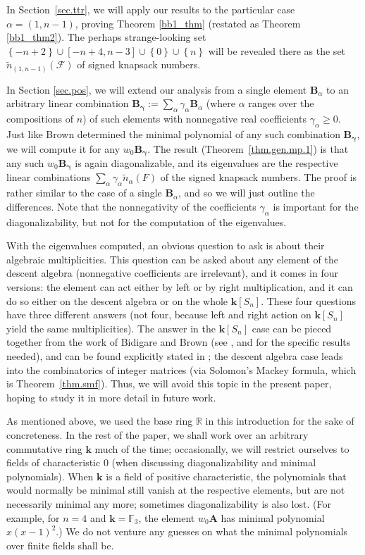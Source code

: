 \documentclass[12pt]{article}
\theoremstyle{definition}%
\theoremstyle{definition}%
\theoremstyle{remark}%
\newcommand{\tup}[1]{\left( #1 \right)}
\newcommand{\interval}[1]{\left[ #1 \right]} %
\newcommand{\set}[1]{\left\{ #1 \right\}}
\newcommand{\RR}{\mathbb{R}}
\newcommand{\kk}{\mathbf{k}}
\newcommand{\ksn}{\kk\left[S_n\right]}
\newcommand{\A}{\mathbf{A}}
\newcommand{\BB}{\mathbf{B}}
\newcommand{\BBa}{\mathbf{B}_{\alpha}}
\newcommand{\CF}{\mathcal{F}}
\newcommand{\bgamma}{\bm{\gamma}}
\newcommand{\wo}{w_0} %
\newcommand{\nn}{\widetilde{n}}%
\newcommand{\nna}{\widetilde{n}_{ \alpha } }%
\begin{document}
In Section~\ref{sec.ttr}, we will apply our results to the particular case $\alpha = \tup{1, n-1}$, proving Theorem \ref{bb1_thm} (restated as Theorem \ref{bb1_thm2}).
The perhaps strange-looking set $\set{-n+2} \cup \interval{-n+4, n-3} \cup \set{0} \cup \set{n}$ will be revealed there as the set $\nn_{\tup{1,n-1}}\tup{\CF}$ of signed knapsack numbers.

In Section \ref{sec.pos}, we will extend our analysis from a single element $\BBa$ to an arbitrary linear combination $\BB_{\bgamma} := \sum_{\alpha} \gamma_\alpha \BBa$ (where $\alpha$ ranges over the compositions of $n$) of such elements with nonnegative real coefficients $\gamma_\alpha \geq 0$.
Just like Brown determined the minimal polynomial of any such combination $\BB_{\bgamma}$, we will compute it for any $\wo \BB_{\bgamma}$.
The result (Theorem~\ref{thm.gen.mp.1}) is that any such $\wo \BB_{\bgamma}$ is again diagonalizable, and its eigenvalues are the respective linear combinations $\sum_{\alpha} \gamma_\alpha \nna\tup{F}$ of the signed knapsack numbers.
The proof is rather similar to the case of a single $\BBa$, and so we will just outline the differences.
Note that the nonnegativity of the coefficients $\gamma_\alpha$ is important for the diagonalizability, but not for the computation of the eigenvalues.

With the eigenvalues computed, an obvious question to ask is about their algebraic multiplicities.
This question can be asked about any element of the descent algebra (nonnegative coefficients are irrelevant), and it comes in four versions: the element can act either by left or by right multiplication, and it can do so either on the descent algebra or on the whole $\ksn$.
These four questions have three different answers (not four, because left and right action on $\ksn$ yield the same multiplicities).
The answer in the $\ksn$ case can be pieced together from the work of Bidigare \cite[Sections 3.8 and 4.1]{Bidigare-thesis} and Brown \cite[Appendix B]{Brown-Methods} (see \cite[Theorem 1.2]{dc2023}, \cite[Proposition 4.2]{ReSaWe14} and \cite[Corollary 4.1.3]{Bidigare-thesis} for the specific results needed), and can be found explicitly stated in \cite[Corollary 4 and Proposition 4]{GriVas26};
the descent algebra case leads into the combinatorics of integer matrices (via Solomon's Mackey formula, which is Theorem~\ref{thm.smf}). %
Thus, we will avoid this topic in the present paper, hoping to study it in more detail in future work.

As mentioned above, we used the base ring $\RR$ in this introduction for the sake of concreteness.
In the rest of the paper, we shall work over an arbitrary commutative ring $\kk$ much of the time; occasionally, we will restrict ourselves to fields of characteristic $0$ (when discussing diagonalizability and minimal polynomials).
When $\kk$ is a field of positive characteristic, the polynomials that would normally be minimal still vanish at the respective elements, but are not necessarily minimal any more; sometimes diagonalizability is also lost.
(For example, for $n = 4$ and $\kk = \mathbb{F}_3$, the element $\wo\A$ has minimal polynomial $x\tup{x-1}^2$.)
We do not venture any guesses on what the minimal polynomials over finite fields shall be.
\end{document}
